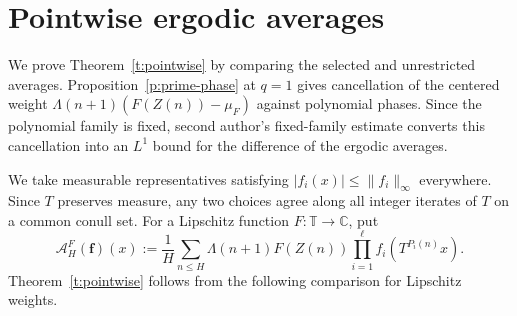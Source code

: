 \documentclass[12pt]{amsart}
\newcommand{\1}{\mathbf 1}
\newtheorem{theorem}{Theorem}[section]
\theoremstyle{definition}
\begin{document}


\section{Pointwise ergodic averages}\label{s:ergodic}

We prove Theorem~\ref{t:pointwise} by comparing the selected and
unrestricted averages. Proposition~\ref{p:prime-phase} at \(q=1\)
gives cancellation of the centered weight
\(\Lambda(n+1)(F(Z(n))-\mu_F)\) against polynomial phases.
Since the polynomial family is fixed, %
second author's
fixed-family estimate converts this cancellation into an
\(L^1\) bound for the difference of the ergodic averages.

We take measurable representatives satisfying
$|f_i(x)|\leq\|f_i\|_\infty$ everywhere. Since $T$ preserves measure,
any two choices agree along all integer iterates of $T$ on a common
conull set. For a Lipschitz function \(F:\mathbb T\to\mathbb C\), put
\[
 \mathcal A_H^F(\mathbf f)(x)
 :=\frac1H\sum_{n\le H}\Lambda(n+1)F(Z(n))
       \prod_{i=1}^{\ell} f_i(T^{P_i(n)}x).
\]
Theorem~\ref{t:pointwise} follows from the following comparison for
Lipschitz weights.
\end{document}
